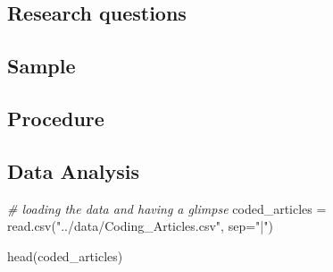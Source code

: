 \documentclass[cm]{glossa}
\newenvironment{Shaded}{\begin{snugshade}}{\end{snugshade}}
\newcommand{\AttributeTok}[1]{\textcolor[rgb]{0.77,0.63,0.00}{#1}}
\newcommand{\CommentTok}[1]{\textcolor[rgb]{0.56,0.35,0.01}{\textit{#1}}}
\newcommand{\FunctionTok}[1]{\textcolor[rgb]{0.00,0.00,0.00}{#1}}
\newcommand{\NormalTok}[1]{#1}
\newcommand{\OtherTok}[1]{\textcolor[rgb]{0.56,0.35,0.01}{#1}}
\newcommand{\StringTok}[1]{\textcolor[rgb]{0.31,0.60,0.02}{#1}}
\begin{document}
\hypertarget{research-questions-1}{%
\subsection{Research questions}\label{research-questions-1}}

\hypertarget{sample-1}{%
\subsection{Sample}\label{sample-1}}

\hypertarget{procedure-1}{%
\subsection{Procedure}\label{procedure-1}}

\hypertarget{data-analysis-1}{%
\subsection{Data Analysis}\label{data-analysis-1}}

\begin{Shaded}
\begin{Highlighting}[]
\CommentTok{\# loading the data and having a glimpse}
\NormalTok{coded\_articles }\OtherTok{=} \FunctionTok{read.csv}\NormalTok{(}\StringTok{"../data/Coding\_Articles.csv"}\NormalTok{, }\AttributeTok{sep=}\StringTok{"|"}\NormalTok{)}

\FunctionTok{head}\NormalTok{(coded\_articles)}
\end{Highlighting}
\end{Shaded}
\end{document}
